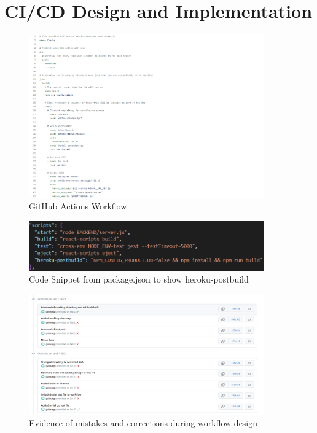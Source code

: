 \chapter{CI/CD Design and Implementation}\label{appendix:CICD}
\begin{figure}[h!]
    \centering
    \includegraphics[width=0.9\textwidth]{images/full-workflow.png}
    \caption{GitHub Actions Workflow}
    \label{image:full-workflow}
\end{figure}

\begin{figure}[h!]
    \centering
    \includegraphics[width=0.9\textwidth]{images/heroku-build.png}
    \caption{Code Snippet from package.json to show heroku-postbuild}
    \label{image:heroku-build}
\end{figure}

\begin{figure}[h!]
    \centering
    \includegraphics[width=0.9\textwidth]{images/workflow-failed.png}
    \caption{Evidence of mistakes and corrections during workflow design}
    \label{image:workflow-failed}
\end{figure}

